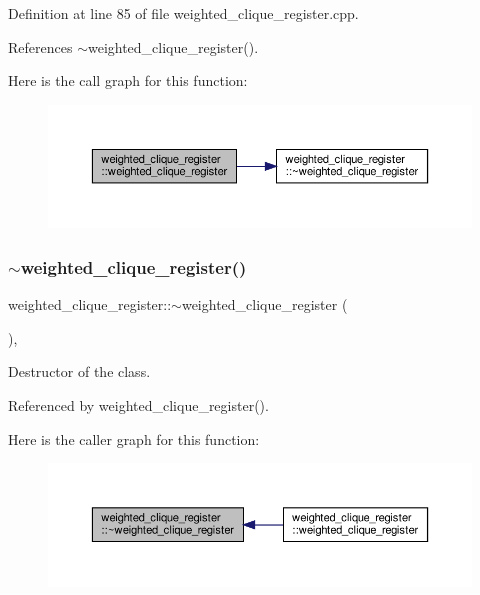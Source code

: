 Definition at line 85 of file weighted\+\_\+clique\+\_\+register.\+cpp.



References $\sim$weighted\+\_\+clique\+\_\+register().

Here is the call graph for this function\+:
\nopagebreak
\begin{figure}[H]
\begin{center}
\leavevmode
\includegraphics[width=350pt]{dd/dd9/classweighted__clique__register_a19fe57763a2e1ea8ca41c3cf53251e06_cgraph}
\end{center}
\end{figure}
\mbox{\label{classweighted__clique__register_a9fa17863c3a85d94e5c04f18f2f71ec6}} 
\subsubsection{\texorpdfstring{$\sim$weighted\+\_\+clique\+\_\+register()}{~weighted\_clique\_register()}}
{\footnotesize\ttfamily weighted\+\_\+clique\+\_\+register\+::$\sim$weighted\+\_\+clique\+\_\+register (\begin{DoxyParamCaption}{ }\end{DoxyParamCaption})\hspace{0.3cm}{\ttfamily [override]}, {\ttfamily [default]}}



Destructor of the class. 



Referenced by weighted\+\_\+clique\+\_\+register().

Here is the caller graph for this function\+:
\nopagebreak
\begin{figure}[H]
\begin{center}
\leavevmode
\includegraphics[width=350pt]{dd/dd9/classweighted__clique__register_a9fa17863c3a85d94e5c04f18f2f71ec6_icgraph}
\end{center}
\end{figure}


